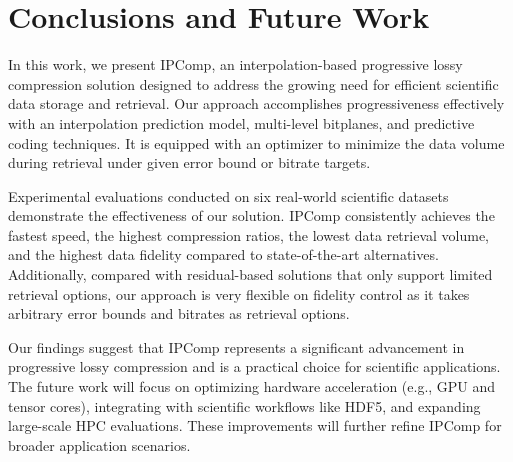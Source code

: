 \section{Conclusions and Future Work}
\label{sec:conclusion}

In this work, we present IPComp, an interpolation-based progressive lossy compression solution designed to address the growing need for efficient scientific data storage and retrieval. Our approach accomplishes progressiveness effectively with an interpolation prediction model, multi-level bitplanes, and predictive coding techniques. It is equipped with an optimizer to minimize the data volume during retrieval under given error bound or bitrate targets. 

Experimental evaluations conducted on six real-world scientific datasets demonstrate the effectiveness of our solution. IPComp consistently achieves the fastest speed, the highest compression ratios, the lowest data retrieval volume, and the highest data fidelity compared to state-of-the-art alternatives. Additionally, compared with residual-based solutions that only support limited retrieval options, our approach is very flexible on fidelity control as it takes arbitrary error bounds and bitrates as retrieval options. 

Our findings suggest that IPComp represents a significant advancement in progressive lossy compression and is a practical choice for scientific applications. The future work will focus on optimizing hardware acceleration (e.g., GPU and tensor cores), integrating with scientific workflows like HDF5, and expanding large-scale HPC evaluations. These improvements will further refine IPComp for broader application scenarios.